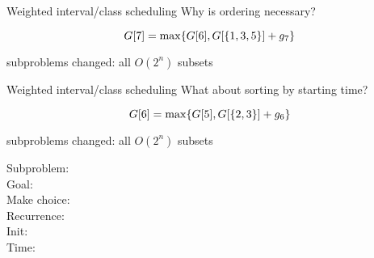\begin{frame}{Weighted interval/class scheduling}
  Why is ordering necessary?

  \[
	G[7] = \max \{G[6], G[\{1,3,5\}] + g_{7}\}
  \]

  \begin{center}
	subproblems changed: all $O(2^{n})$ subsets
  \end{center}
\end{frame}
\begin{frame}{Weighted interval/class scheduling}
  What about sorting by starting time?

  \[
	G[6] = \max \{G[5], G[\{2,3\}] + g_{6}\}
  \]

  \begin{center}
	subproblems changed: all $O(2^{n})$ subsets
  \end{center}
\end{frame}
\begin{frame}{}
  \begin{description}
	\item[Subproblem:]
	\item[Goal:] 
	  \pause
	\item[Make choice:] 
	\item[Recurrence:] 
	  \pause
	\item[Init:]
	\item[Time:] 
  \end{description}
\end{frame}
